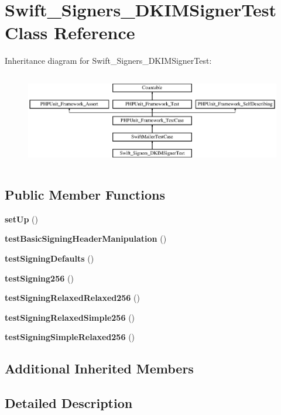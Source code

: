 \section{Swift\+\_\+\+Signers\+\_\+\+D\+K\+I\+M\+Signer\+Test Class Reference}
\label{class_swift___signers___d_k_i_m_signer_test}
Inheritance diagram for Swift\+\_\+\+Signers\+\_\+\+D\+K\+I\+M\+Signer\+Test\+:\begin{figure}[H]
\begin{center}
\leavevmode
\includegraphics[height=4.129793cm]{class_swift___signers___d_k_i_m_signer_test}
\end{center}
\end{figure}
\subsection*{Public Member Functions}
\begin{DoxyCompactItemize}
\item 
{\bf set\+Up} ()
\item 
{\bf test\+Basic\+Signing\+Header\+Manipulation} ()
\item 
{\bf test\+Signing\+Defaults} ()
\item 
{\bf test\+Signing256} ()
\item 
{\bf test\+Signing\+Relaxed\+Relaxed256} ()
\item 
{\bf test\+Signing\+Relaxed\+Simple256} ()
\item 
{\bf test\+Signing\+Simple\+Relaxed256} ()
\end{DoxyCompactItemize}
\subsection*{Additional Inherited Members}


\subsection{Detailed Description}


